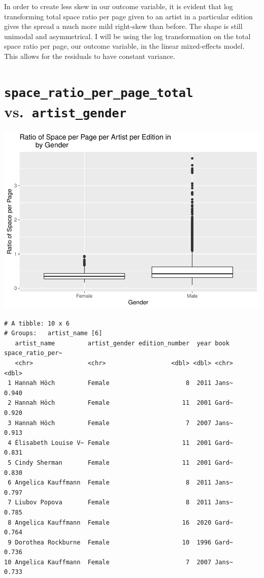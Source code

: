 \documentclass[
  letterpaper,
  DIV=11,
  numbers=noendperiod]{scrreprt}
\begin{document}
In order to create less skew in our outcome variable, it is evident that
log transforming total space ratio per page given to an artist in a
particular edition gives the spread a much more mild right-skew than
before. The shape is still unimodal and asymmetrical. I will be using
the log transformation on the total space ratio per page, our outcome
variable, in the linear mixed-effects model. This allows for the
residuals to have constant variance.

\hypertarget{space_ratio_per_page_total-vs.-artist_gender}{%
\section{\texorpdfstring{\texttt{space\_ratio\_per\_page\_total}
vs.~\texttt{artist\_gender}}{space\_ratio\_per\_page\_total vs.~artist\_gender}}\label{space_ratio_per_page_total-vs.-artist_gender}}

\includegraphics{Chapter1/Chapter1_files/figure-pdf/genderallbooks-1.pdf}

\begin{verbatim}
# A tibble: 10 x 6
# Groups:   artist_name [6]
   artist_name         artist_gender edition_number  year book  space_ratio_per~
   <chr>               <chr>                  <dbl> <dbl> <chr>            <dbl>
 1 Hannah Höch         Female                     8  2011 Jans~            0.940
 2 Hannah Höch         Female                    11  2001 Gard~            0.920
 3 Hannah Höch         Female                     7  2007 Jans~            0.913
 4 Élisabeth Louise V~ Female                    11  2001 Gard~            0.831
 5 Cindy Sherman       Female                    11  2001 Gard~            0.830
 6 Angelica Kauffmann  Female                     8  2011 Jans~            0.797
 7 Liubov Popova       Female                     8  2011 Jans~            0.785
 8 Angelica Kauffmann  Female                    16  2020 Gard~            0.764
 9 Dorothea Rockburne  Female                    10  1996 Gard~            0.736
10 Angelica Kauffmann  Female                     7  2007 Jans~            0.733
\end{verbatim}
\end{document}
